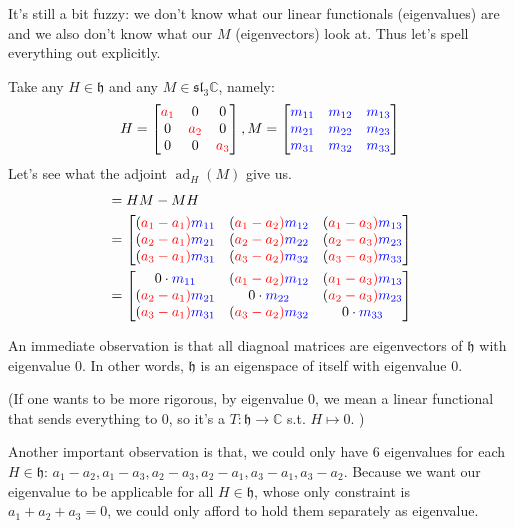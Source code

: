 \documentclass[a4paper]{article}
\newcommand{\C}{\mathbb{C}}
\theoremstyle{bfnote} %
\theoremstyle{bfnote}                  %
\theoremstyle{example}                       %
\theoremstyle{remark}                       %
\numberwithin{equation}{section}
\begin{document}
\bigskip

It's still a bit fuzzy: we don't know what our linear functionals (eigenvalues) are and we also don't know what our $M$ (eigenvectors) look at. Thus let's spell everything out explicitly.

Take any  $H \in \mathfrak{h}$ and any $M \in \mathfrak{sl}_3\C$, namely: \[
		H = \def\a{\color{red}a} \begin{bmatrix} \a_1 & 0 & 0 \\ 0 & \a_2 &0 \\ 0 &0 &\a_3 \end{bmatrix}, M = \def\m{\color{blue}m} \begin{bmatrix} \m_{11} & \m_{12} & \m_{13} \\ \m_{21} & \m_{22} & \m_{23} \\ \m_{31} & \m_{32} & \m_{33} \end{bmatrix} 
	\]
Let's see what the adjoint $\operatorname{ad}_{H}(M)$ give us.
\begin{align*}
[H,M] &= HM - MH \\ &= \def\a{\color{red}a} \def\m{\color{blue}m} \begin{bmatrix} (\a_1-\a_1)\m_{11} & (\a_1-\a_2)\m_{12} & (\a_1-\a_3)\m_{13} \\ (\a_2-\a_1)\m_{21} & (\a_2-\a_2)\m_{22} & (\a_2-\a_3)\m_{23} \\ (\a_3-\a_1)\m_{31} & (\a_3-\a_2)\m_{32} & (\a_3-\a_3)\m_{33} \end{bmatrix} \\
		      &=  \def\a{\color{red}a} \def\m{\color{blue}m} \begin{bmatrix} 0 \cdot \m_{11} & (\a_1-\a_2)\m_{12} & (\a_1-\a_3)\m_{13} \\ (\a_2-\a_1)\m_{21} & 0 \cdot \m_{22} & (\a_2-\a_3)\m_{23} \\ (\a_3-\a_1)\m_{31} & (\a_3-\a_2)\m_{32} & 0 \cdot \m_{33} \end{bmatrix} 
\end{align*}

An immediate observation is that all diagnoal matrices are eigenvectors of $\mathfrak{h}$ with eigenvalue  $0$. In other words,  $\mathfrak{h}$ is an eigenspace  of itself with eigenvalue $0$.

(If one wants to be more rigorous, by eigenvalue  $0$, we mean a linear functional that sends everything to $0$, so it's a  $T: \mathfrak{h}\to \C$ s.t. $H \mapsto 0$. )

Another important observation is that, we could only have $6$ eigenvalues for each  $H \in \mathfrak{h}$: $a_1-a_2, a_1-a_3, a_2-a_3, a_2-a_1, a_3-a_1, a_3-a_2$. Because we want our eigenvalue to be applicable for all $H \in \mathfrak{h}$, whose only constraint is $a_1+a_2+a_3 = 0$, we could only afford to hold them separately as eigenvalue.
\end{document}
